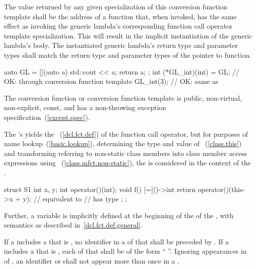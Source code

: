 \exitexample
The value returned by any given specialization of this conversion function
template shall be the address of a function that, when invoked, has the same
effect as invoking the generic lambda's corresponding function call operator
template specialization.
\enternote
This will result in the implicit instantiation of the generic lambda's body.
The instantiated generic lambda's return type and parameter types shall match
the return type and parameter types of the pointer to function.
\exitnote
\enterexample
\begin{codeblock}
auto GL = [](auto a) { std::cout << a; return a; };
int (*GL_int)(int) = GL;  // OK: through conversion function template
GL_int(3);                // OK: same as 
\end{codeblock}
\exitexample
The conversion function or conversion function template is public,
non-virtual, non-explicit, const, and has a non-throwing exception
specification~(\ref{except.spec}).

\pnum
The 's  yields the
~(\ref{dcl.fct.def}) of the function call operator, but for
purposes of name lookup~(\ref{basic.lookup}), determining the type and value of
~(\ref{class.this}) and transforming 
referring to non-static class members into class member access expressions using
~(\ref{class.mfct.non-static}), the  is
considered in the context of the . \enterexample

\begin{codeblock}
struct S1 {
  int x, y;
  int operator()(int);
  void f() {
    [=]()->int {
      return operator()(this->x + y); // equivalent to 
                                      //  has type 
    };
  }
};
\end{codeblock}
\exitexample
Further, a variable  is implicitly defined at the beginning of
the  of the ,
with semantics as described in~\ref{dcl.fct.def.general}.

\pnum
If a  includes a  that
is \tcode{\&}, no identifier in a  of that
 shall be preceded
by \tcode{\&}. If a  includes a
 that is \tcode{=}, each
 of that  shall
be of the form ``\tcode{\&} ''. Ignoring appearances in
 of , an identifier or
 shall not appear more than once in a
. \enterexample

